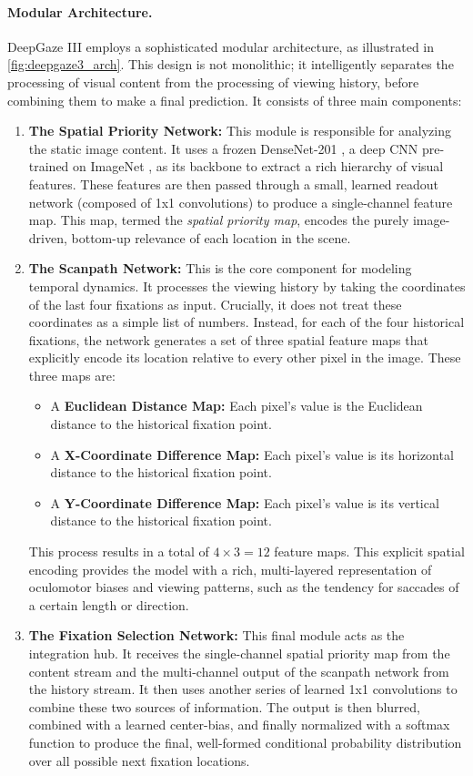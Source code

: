 \paragraph{Modular Architecture.} DeepGaze III employs a sophisticated modular architecture, as illustrated in \cref{fig:deepgaze3_arch}. This design is not monolithic; it intelligently separates the processing of visual content from the processing of viewing history, before combining them to make a final prediction. It consists of three main components:
\begin{enumerate}
\item \textbf{The Spatial Priority Network:} This module is responsible for analyzing the static image content. It uses a frozen DenseNet-201 \cite{huang2017densely}, a deep CNN pre-trained on ImageNet \cite{deng2009imagenet}, as its backbone to extract a rich hierarchy of visual features. These features are then passed through a small, learned readout network (composed of 1x1 convolutions) to produce a single-channel feature map. This map, termed the \emph{spatial priority map}, encodes the purely image-driven, bottom-up relevance of each location in the scene.
\item \textbf{The Scanpath Network:} This is the core component for modeling temporal dynamics. It processes the viewing history by taking the coordinates of the last four fixations as input. Crucially, it does not treat these coordinates as a simple list of numbers. Instead, for each of the four historical fixations, the network generates a set of three spatial feature maps that explicitly encode its location relative to every other pixel in the image. These three maps are:
\begin{itemize}
\item A \textbf{Euclidean Distance Map:} Each pixel's value is the Euclidean distance to the historical fixation point.
\item A \textbf{X-Coordinate Difference Map:} Each pixel's value is its horizontal distance to the historical fixation point.
\item A \textbf{Y-Coordinate Difference Map:} Each pixel's value is its vertical distance to the historical fixation point.
\end{itemize}
This process results in a total of $4 \times 3 = 12$ feature maps. This explicit spatial encoding provides the model with a rich, multi-layered representation of oculomotor biases and viewing patterns, such as the tendency for saccades of a certain length or direction.
\item \textbf{The Fixation Selection Network:} This final module acts as the integration hub. It receives the single-channel spatial priority map from the content stream and the multi-channel output of the scanpath network from the history stream. It then uses another series of learned 1x1 convolutions to combine these two sources of information. The output is then blurred, combined with a learned center-bias, and finally normalized with a softmax function to produce the final, well-formed conditional probability distribution over all possible next fixation locations.
\end{enumerate}
